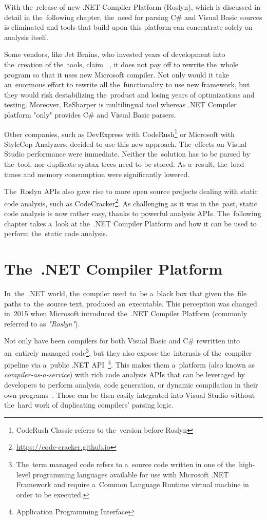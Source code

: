 \documentclass[
  digital, %
  table,   %
  lof,     %
  lot,     %
  oneside,
]{fithesis3}
\begin{document}
With the~release of new .NET Compiler Platform (Roslyn), which is discussed in detail in the~following chapter, the~need for parsing C\# and Visual Basic sources is eliminated and tools that build upon this platform can concentrate solely on analysis itself.

Some vendors, like Jet Brains, who invested years of development into the~creation of the~tools, claim ~\cite{resharper-and-roslyn-qa}, it does not pay off to rewrite the~whole program so that it uses new Microsoft compiler. Not only would it take an~enormous effort to rewrite all the~functionality to use new framework, but they would risk destabilizing the~product and losing years of optimizations and testing. Moreover, ReSharper is multilingual tool whereas .NET Compiler platform "only" provides C\# and Visual Basic parsers.

Other companies, such as DevExpress with CodeRush\footnote{CodeRush Classic referrs to the~version before Roslyn} or Microsoft with StyleCop Analyzers, decided to use this new approach. The~effects on Visual Studio performance were immediate. Neither the~solution has to be parsed by the~tool, nor duplicate syntax trees need to be stored. As a~result, the~load times and memory consumption were significantly lowered.

The~Roslyn APIs also gave rise to more open source projects dealing with static code analysis, such as CodeCracker\footnote{\url{https://code-cracker.github.io}}. As challenging as it was in the~past, static code analysis is now rather easy, thanks to powerful analysis APIs. The~following chapter takes a~look at the~.NET Compiler Platform and how it can be used to perform the~static code analysis.

\chapter{The~.NET Compiler Platform}
In~the~.NET world, the~compiler used~to~be a~black box that given the~file paths to~the~source text, produced an~executable. This perception was changed in~2015 when Microsoft introduced the~.NET Compiler Platform (commonly referred to as \textit{"Roslyn"}).

Not only have been compilers for both Visual Basic and C\# rewritten into an~entirely managed code\footnote{The~term managed code refers to a~source code written in one of the~high-level programming languages available for use with Microsoft .NET Framework and require a~Common Language Runtime virtual machine in order to be executed.}, but they also expose the~internals of the~compiler pipeline via a~public .NET API~\footnote{Application Programming Interface}. This makes them a~platform (also known as \textit{compiler-as-a-service}) with rich code analysis APIs that can be leveraged by developers to perform analysis, code generation, or dynamic compilation in their own programs~\cite{roslyn-succinctly}. Those can be then easily integrated into Visual Studio without the~hard work of duplicating compilers' parsing logic.
\end{document}
